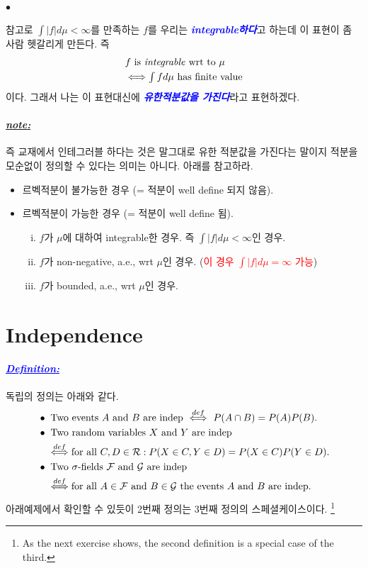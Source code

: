 \documentclass[12pt,oneside,english,a4paper]{article}
\def\ck{\paragraph{\Large$\bullet$}\Large}
\def\note{\paragraph{\Large\textit{\underline{note:}}}\Large}
\newcommand{\parablue}[1]{\paragraph{\Large\textcolor{blue}{\it\underline{\textbf{#1:}}}}\Large}
\begin{document}
\ck 참고로 $\int |f| d\mu < \infty$를 만족하는 $f$를 우리는 \textcolor{blue}{\textbf{\emph{integrable하다}}}고 하는데 이 표현이 좀 사람 헷갈리게 만든다. 즉 
\begin{align*}
& \mbox{$f$ is \emph{integrable} wrt to $\mu$} \\ 
& \Longleftrightarrow \mbox{$\int fd\mu$ has finite value}
\end{align*}
이다. 그래서 나는 이 표현대신에 \textcolor{blue}{\textbf{\emph{유한적분값을 가진다}}}라고 표현하겠다.

\note 즉 교재에서 인테그러블 하다는 것은 말그대로 유한 적분값을 가진다는 말이지 적분을 모순없이 정의할 수 있다는 의미는 아니다. 아래를 참고하라.
\begin{itemize}
	\item 르벡적분이 불가능한 경우 (= 적분이 well define 되지 않음).
	\item 르벡적분이 가능한 경우 (= 적분이 well define 됨).
	\begin{enumerate}[(i)]
		\item $f$가 $\mu$에 대하여 integrable한 경우. 즉 $\int |f|d\mu<\infty$인 경우. 
		\item $f$가 non-negative, a.e., wrt $\mu$인 경우. (\textcolor{red}{이 경우 $\int |f|d\mu=\infty$ 가능})
		\item $f$가 bounded, a.e., wrt $\mu$인 경우. 
	\end{enumerate}
\end{itemize}

\section{Independence}
\parablue{Definition} 독립의 정의는 아래와 같다. 
\begin{align*}
&\bullet ~ \mbox{Two events $A$ and $B$ are indep}~ \overset{def}{\Longleftrightarrow} ~ P(A\cap B)=P(A)P(B).\\
&\bullet ~ \mbox{Two random variables $X$ and $Y$ are indep} \\ 
& \quad \overset{def}{\Longleftrightarrow} \mbox{for all $C,D \in {\cal R}$}: P(X\in C, Y \in D)=P(X \in C)P(Y \in D).\\
&\bullet ~ \mbox{Two $\sigma$-fields ${\cal F}$ and ${\cal G}$ are indep} \\
& \quad \overset{def}{\Longleftrightarrow} \mbox{for all $A \in {\cal F}$ and $B \in {\cal G}$ the events $A$ and $B$ are indep.}
\end{align*}
아래예제에서 확인할 수 있듯이 2번째 정의는 3번째 정의의 스페셜케이스이다. \footnote{As the next exercise shows, the second definition is a special case of the third.}
\end{document}
